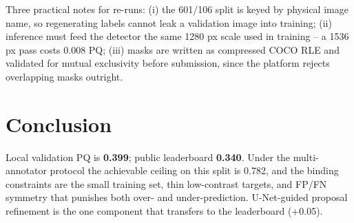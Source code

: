 \documentclass[conference]{IEEEtran}
\begin{document}
Three practical notes for re-runs: (i) the 601/106 split is keyed by physical
image name, so regenerating labels cannot leak a validation image into training;
(ii) inference must feed the detector the same 1280 px scale used in training --
a 1536 px pass costs 0.008 PQ; (iii) masks are written as compressed COCO RLE
and validated for mutual exclusivity before submission, since the platform
rejects overlapping masks outright.
\section{Conclusion}
Local validation PQ is \textbf{0.399}; public leaderboard \textbf{0.340}. Under the multi-annotator protocol the achievable ceiling on this split is 0.782, and the binding constraints are the small training set, thin low-contrast targets, and FP/FN symmetry that punishes both over- and under-prediction. U-Net-guided proposal refinement is the one component that transfers to the leaderboard (+0.05).
\end{document}
